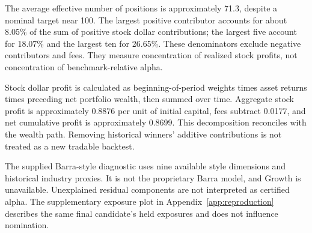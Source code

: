 \documentclass[11pt]{article}
\begin{document}
The average effective number of positions is approximately 71.3, despite a nominal target near 100. The largest positive contributor accounts for about 8.05\% of the sum of positive stock dollar contributions; the largest five account for 18.07\% and the largest ten for 26.65\%. These denominators exclude negative contributors and fees. They measure concentration of realized stock profits, not concentration of benchmark-relative alpha.

Stock dollar profit is calculated as beginning-of-period weights times asset returns times preceding net portfolio wealth, then summed over time. Aggregate stock profit is approximately 0.8876 per unit of initial capital, fees subtract 0.0177, and net cumulative profit is approximately 0.8699. This decomposition reconciles with the wealth path. Removing historical winners' additive contributions is not treated as a new tradable backtest.

The supplied Barra-style diagnostic uses nine available style dimensions and historical industry proxies. It is not the proprietary Barra model, and Growth is unavailable. Unexplained residual components are not interpreted as certified alpha. The supplementary exposure plot in Appendix~\ref{app:reproduction} describes the same final candidate's held exposures and does not influence nomination.
\clearpage
\end{document}

